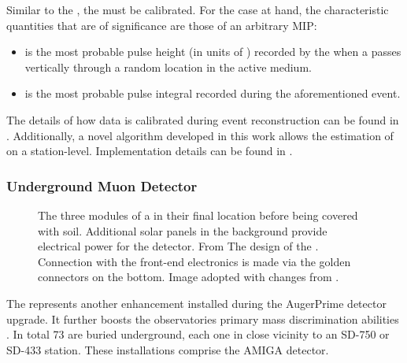 Similar to the \WCD, the \SSD must be calibrated. For the case at hand, the 
characteristic quantities that are of significance are those of an arbitrary 
\acf{MIP}:

\begin{itemize}
	\item \Imip is the most probable pulse height (in units of \ADC) 
	recorded by the \SSD \PMT when a \MIP passes vertically through a 
	random location in the \SSD active medium.
	\item \Qmip is the most probable pulse integral recorded during the 
	aforementioned event.
\end{itemize}

The details of how \SSD data is calibrated during event reconstruction can be
found in . Additionally, a novel algorithm developed in this
work allows the estimation of \Imip on a station-level. Implementation details 
can be found in .

\subsubsection{Underground Muon Detector}
\label{sssec:umd}

\begin{figure}[t]
  \centering
  \hspace{0.2cm}
  \caption[]{The three modules of a \UMD in their final 
  location before being covered with soil. Additional solar panels in the 
  background provide electrical power for the detector. From 
  \cite{pierreaugercollaborationUMDUndergroundMuon}  The \PCB
  design of the \UUB. Connection with the front-end electronics is made via the
  golden connectors on the bottom. Image adopted with changes from 
\cite{nitzNewElectronicsSurface2021}.}
  \label{fig:umd-and-uub}
\end{figure}


The \UMD represents another enhancement installed during the AugerPrime 
detector upgrade. It further boosts the observatories primary mass 
discrimination abilities \cite{collaborationPierreAugerObservatory2016}. In 
total 73 \UMDs are buried underground, each one in close vicinity to an SD-750 
or SD-433 station. These installations comprise the \acf{AMIGA} detector.

